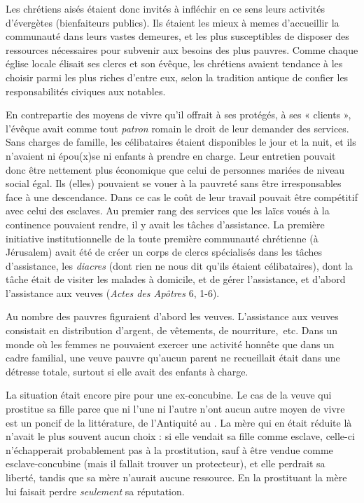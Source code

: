  Les chrétiens aisés étaient donc invités à infléchir en ce sens leurs activités d'évergètes (bienfaiteurs publics). Ils étaient les mieux à memes d'accueillir la communauté dans leurs vastes demeures, et les plus susceptibles de disposer des ressources nécessaires pour subvenir aux besoins des plus pauvres. Comme chaque église locale élisait ses clercs et son évêque, les chrétiens avaient tendance à les choisir parmi les plus riches d'entre eux, selon la tradition antique de confier les responsabilités civiques aux notables. 

 En contrepartie des moyens de vivre qu'il offrait à ses protégés, à ses « clients », l'évêque avait comme tout \emph{patron} romain le droit de leur demander des services. Sans charges de famille, les célibataires étaient disponibles le jour et la nuit, et ils n'avaient ni épou(x)se ni enfants à prendre en charge. Leur entretien pouvait donc être nettement plus économique que celui de personnes mariées de niveau social égal. Ils (elles) pouvaient se vouer à la pauvreté sans être irresponsables face à une descendance. Dans ce cas le coût de leur travail pouvait être compétitif avec celui des esclaves. Au premier rang des services que les laïcs voués à la continence pouvaient rendre, il y avait les tâches d'assistance. La première initiative institutionnelle de la toute première communauté chrétienne (à Jérusalem) avait été de créer un corps de clercs spécialisés dans les tâches d'assistance, les \emph{diacres} (dont rien ne nous dit qu'ils étaient célibataires), dont la tâche était de visiter les malades à domicile, et de gérer l'assistance, et d'abord l'assistance aux veuves (\emph{Actes des Apôtres} 6, 1-6). 



Au nombre des pauvres figuraient d'abord les veuves. L'assistance aux veuves consistait en distribution d'argent, de vêtements, de nourriture,~etc. Dans un monde où les femmes ne pouvaient exercer une activité honnête que dans un cadre familial, une veuve pauvre qu'aucun parent ne recueillait était dans une détresse totale, surtout si elle avait des enfants à charge. 

 La situation était encore pire pour une ex-concubine. Le cas de la veuve qui prostitue sa fille parce que ni l'une ni l'autre n'ont aucun autre moyen de vivre est un poncif de la littérature, de l'Antiquité au . La mère qui en était réduite là n'avait le plus souvent aucun choix : si elle vendait sa fille comme esclave, celle-ci n'échapperait probablement pas à la prostitution, sauf à être vendue comme esclave-concubine (mais il fallait trouver un protecteur), et elle perdrait sa liberté, tandis que sa mère n'aurait aucune ressource. En la prostituant la mère lui faisait perdre \emph{seulement} sa réputation. 

